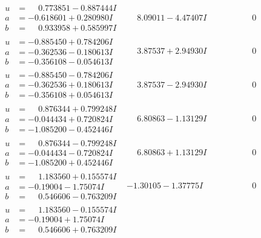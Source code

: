 \documentclass[1p]{elsarticle_modified}
\theoremstyle{definition}
\begin{document}
$$\begin{array}{c|c|c}
\begin{aligned}
u &= \phantom{-}0.773851 - 0.887444 I \\
a &= -0.618601 + 0.280980 I \\
b &= \phantom{-}0.933958 + 0.585997 I\end{aligned}
 & \phantom{-}8.09011 - 4.47407 I & \phantom{-0.000000 } 0 \\ \hline\begin{aligned}
u &= -0.885450 + 0.784206 I \\
a &= -0.362536 - 0.180613 I \\
b &= -0.356108 - 0.054613 I\end{aligned}
 & \phantom{-}3.87537 + 2.94930 I & \phantom{-0.000000 } 0 \\ \hline\begin{aligned}
u &= -0.885450 - 0.784206 I \\
a &= -0.362536 + 0.180613 I \\
b &= -0.356108 + 0.054613 I\end{aligned}
 & \phantom{-}3.87537 - 2.94930 I & \phantom{-0.000000 } 0 \\ \hline\begin{aligned}
u &= \phantom{-}0.876344 + 0.799248 I \\
a &= -0.044434 + 0.720824 I \\
b &= -1.085200 - 0.452446 I\end{aligned}
 & \phantom{-}6.80863 - 1.13129 I & \phantom{-0.000000 } 0 \\ \hline\begin{aligned}
u &= \phantom{-}0.876344 - 0.799248 I \\
a &= -0.044434 - 0.720824 I \\
b &= -1.085200 + 0.452446 I\end{aligned}
 & \phantom{-}6.80863 + 1.13129 I & \phantom{-0.000000 } 0 \\ \hline\begin{aligned}
u &= \phantom{-}1.183560 + 0.155574 I \\
a &= -0.19004 - 1.75074 I \\
b &= \phantom{-}0.546606 - 0.763209 I\end{aligned}
 & -1.30105 - 1.37775 I & \phantom{-0.000000 } 0 \\ \hline\begin{aligned}
u &= \phantom{-}1.183560 - 0.155574 I \\
a &= -0.19004 + 1.75074 I \\
b &= \phantom{-}0.546606 + 0.763209 I\end{aligned}

\end{array}$$
\end{document}
